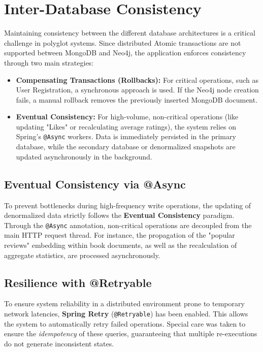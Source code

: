 \section{Inter-Database Consistency}
Maintaining consistency between the different database architectures is a critical challenge in polyglot systems. Since distributed Atomic transactions are not supported between MongoDB and Neo4j, the application enforces consistency through two main strategies:
\begin{itemize}
    \item \textbf{Compensating Transactions (Rollbacks):} For critical operations, such as User Registration, a synchronous approach is used. If the Neo4j node creation fails, a manual rollback removes the previously inserted MongoDB document.
    \item \textbf{Eventual Consistency:} For high-volume, non-critical operations (like updating "Likes" or recalculating average ratings), the system relies on Spring's \texttt{@Async} workers. Data is immediately persisted in the primary database, while the secondary database or denormalized snapshots are updated asynchronously in the background.
\end{itemize}

\subsection{Eventual Consistency via @Async}
To prevent bottlenecks during high-frequency write operations, the updating of denormalized data strictly follows the \textbf{Eventual Consistency} paradigm. 
Through the \texttt{@Async} annotation, non-critical operations are decoupled from the main HTTP request thread. For instance, the propagation of the "popular reviews" embedding within book documents, as well as the recalculation of aggregate statistics, are processed asynchronously.

\subsection{Resilience with @Retryable}
To ensure system reliability in a distributed environment prone to temporary network latencies, \textbf{Spring Retry} (\texttt{@Retryable}) has been enabled. This allows the system to automatically retry failed operations. Special care was taken to ensure the \textit{idempotency} of these queries, guaranteeing that multiple re-executions do not generate inconsistent states.